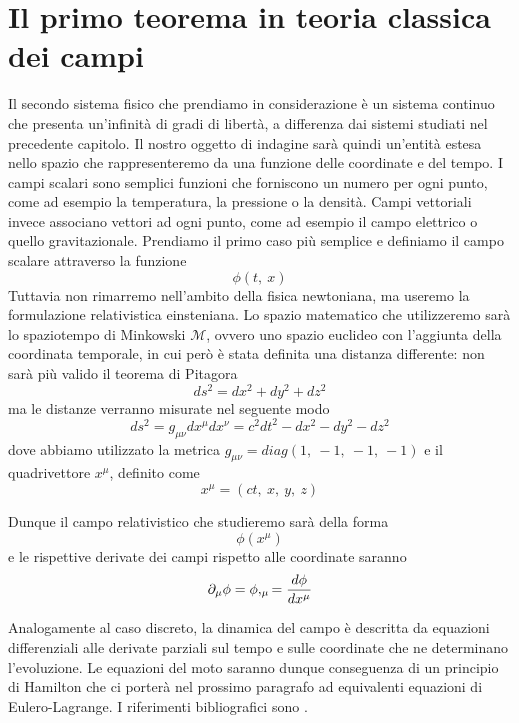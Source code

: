 \chapter{Il primo teorema in teoria classica dei campi}

    Il secondo sistema fisico che prendiamo in considerazione è un sistema continuo che presenta un'infinità di gradi di libertà, a differenza dai sistemi studiati nel precedente capitolo. 
    Il nostro oggetto di indagine sarà quindi un'entità estesa nello spazio che rappresenteremo da una funzione delle coordinate e del tempo. I campi scalari sono semplici funzioni che forniscono un numero per ogni punto, come ad esempio la temperatura, la pressione o la densità. Campi vettoriali invece associano vettori ad ogni punto, come ad esempio il campo elettrico o quello gravitazionale. Prendiamo il primo caso più semplice e definiamo il campo scalare attraverso la funzione 
\begin{equation*}
    \phi(t,~x)
\end{equation*}
    Tuttavia non rimarremo nell'ambito della fisica newtoniana, ma useremo la formulazione relativistica einsteniana. Lo spazio matematico che utilizzeremo sarà lo spaziotempo di Minkowski $\mathcal M$, ovvero uno spazio euclideo con l'aggiunta della coordinata temporale, in cui però è stata definita una distanza differente: non sarà più valido il teorema di Pitagora 
\begin{equation*}
    ds^2 = dx^2 + dy^2 + dz^2
\end{equation*}
    ma le distanze verranno misurate nel seguente modo
\begin{equation*}
    ds^2 = g_{\mu\nu} dx^\mu dx^\nu = c^2 dt^2 - dx^2 - dy^2 - dz^2
\end{equation*}
    dove abbiamo utilizzato la metrica $g_{\mu\nu} = diag(1,~-1,~-1,~-1)$ e il quadrivettore $x^\mu$, definito come 
\begin{equation*}
    x^\mu = (ct,~x,~y,~z)
\end{equation*}
   
    Dunque il campo relativistico che studieremo sarà della forma 
\begin{equation*}
    \phi(x^\mu)
\end{equation*}
    e le rispettive derivate dei campi rispetto alle coordinate saranno
\begin{equation*}
    \partial_\mu \phi =  \phi,_\mu = \frac{d\phi}{dx^\mu}
\end{equation*}

    Analogamente al caso discreto, la dinamica del campo è descritta da equazioni differenziali alle derivate parziali sul tempo e sulle coordinate che ne determinano l'evoluzione. Le equazioni del moto saranno dunque conseguenza di un principio di Hamilton che ci porterà nel prossimo paragrafo ad equivalenti equazioni di Eulero-Lagrange. I riferimenti bibliografici sono \cite{goldstein} \cite{banados} \cite{barone} \cite{landaucampi}.

